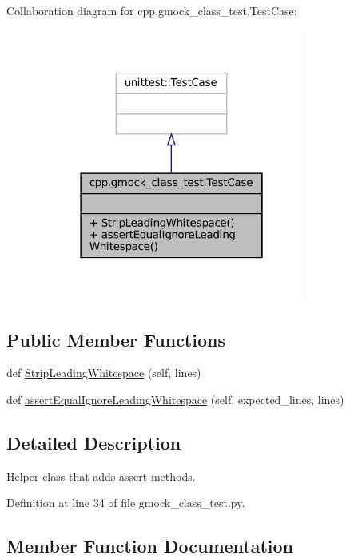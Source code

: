 Collaboration diagram for cpp.\+gmock\+\_\+class\+\_\+test.\+Test\+Case\+:
\nopagebreak
\begin{figure}[H]
\begin{center}
\leavevmode
\includegraphics[width=250pt]{classcpp_1_1gmock__class__test_1_1TestCase__coll__graph}
\end{center}
\end{figure}
\subsection*{Public Member Functions}
\begin{DoxyCompactItemize}
\item 
def \hyperlink{classcpp_1_1gmock__class__test_1_1TestCase_a366b15717eebc41e397357868c5734c5}{Strip\+Leading\+Whitespace} (self, lines)
\item 
def \hyperlink{classcpp_1_1gmock__class__test_1_1TestCase_a68f88bba11511f8c582123d47bf80464}{assert\+Equal\+Ignore\+Leading\+Whitespace} (self, expected\+\_\+lines, lines)
\end{DoxyCompactItemize}


\subsection{Detailed Description}
\begin{DoxyVerb}Helper class that adds assert methods.\end{DoxyVerb}
 

Definition at line 34 of file gmock\+\_\+class\+\_\+test.\+py.



\subsection{Member Function Documentation}
\mbox{\label{classcpp_1_1gmock__class__test_1_1TestCase_a68f88bba11511f8c582123d47bf80464}} 
